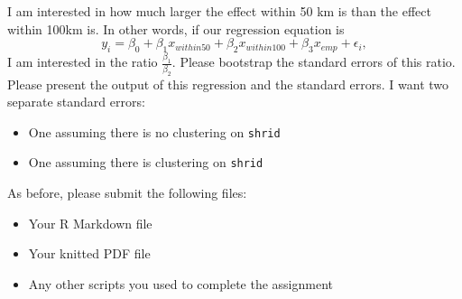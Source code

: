 \documentclass[
]{article}
\providecommand{\tightlist}{%
  \setlength{\itemsep}{0pt}\setlength{\parskip}{0pt}}
\begin{document}
I am interested in how much larger the effect within 50 km is than the effect within 100km is. In other words, if our regression equation is
\[ y_{i} = \beta_0 + \beta_1x_{within50} + \beta_2x_{within100} + \beta_3x_{emp} + \epsilon_i, \]
I am interested in the ratio \(\frac{\beta_1}{\beta_2}\). Please bootstrap the standard errors of this ratio. Please present the output of this regression and the standard errors. I want two separate standard errors:

\begin{itemize}
\tightlist
\item
  One assuming there is no clustering on \texttt{shrid}
\item
  One assuming there is clustering on \texttt{shrid}
\end{itemize}

As before, please submit the following files:

\begin{itemize}
\tightlist
\item
  Your R Markdown file
\item
  Your knitted PDF file
\item
  Any other scripts you used to complete the assignment
\end{itemize}
\end{document}
